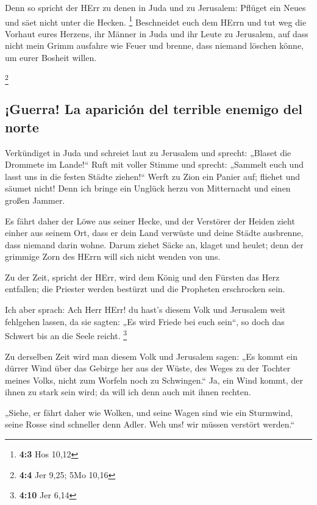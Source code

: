  Denn so spricht der HErr zu denen in Juda und zu
Jerusalem: Pflüget ein Neues und säet nicht unter die Hecken.
\footnote{\textbf{4:3} Hos 10,12}  Beschneidet euch dem
HErrn und tut weg die Vorhaut eures Herzens, ihr Männer in Juda und ihr
Leute zu Jerusalem, auf dass nicht mein Grimm ausfahre wie Feuer und
brenne, dass niemand löschen könne, um eurer Bosheit willen.

\footnote{\textbf{4:4} Jer 9,25; 5Mo 10,16}

\hypertarget{guerra-la-apariciuxf3n-del-terrible-enemigo-del-norte}{%
\subsection{¡Guerra! La aparición del terrible enemigo del
norte}\label{guerra-la-apariciuxf3n-del-terrible-enemigo-del-norte}}

 Verkündiget in Juda und schreiet laut zu Jerusalem und
sprecht: „Blaset die Drommete im Lande!{}`` Ruft mit voller Stimme und
sprecht: „Sammelt euch und lasst uns in die festen Städte ziehen!{}``
 Werft zu Zion ein Panier auf; fliehet und säumet nicht!
Denn ich bringe ein Unglück herzu von Mitternacht und einen großen
Jammer.

 Es fährt daher der Löwe aus seiner Hecke, und der
Verstörer der Heiden zieht einher aus seinem Ort, dass er dein Land
verwüste und deine Städte ausbrenne, dass niemand darin wohne.
 Darum ziehet Säcke an, klaget und heulet; denn der
grimmige Zorn des HErrn will sich nicht wenden von uns.

 Zu der Zeit, spricht der HErr, wird dem König und den
Fürsten das Herz entfallen; die Priester werden bestürzt und die
Propheten erschrocken sein.

 Ich aber sprach: Ach Herr HErr! du hast's diesem Volk
und Jerusalem weit fehlgehen lassen, da sie sagten: „Es wird Friede bei
euch sein``, so doch das Schwert bis an die Seele reicht. \footnote{\textbf{4:10}
  Jer 6,14}

 Zu derselben Zeit wird man diesem Volk und Jerusalem
sagen: „Es kommt ein dürrer Wind über das Gebirge her aus der Wüste, des
Weges zu der Tochter meines Volks, nicht zum Worfeln noch zu
Schwingen.``  Ja, ein Wind kommt, der ihnen zu stark sein
wird; da will ich denn auch mit ihnen rechten.

 „Siehe, er fährt daher wie Wolken, und seine Wagen sind
wie ein Sturmwind, seine Rosse sind schneller denn Adler. Weh uns! wir
müssen verstört werden.``

